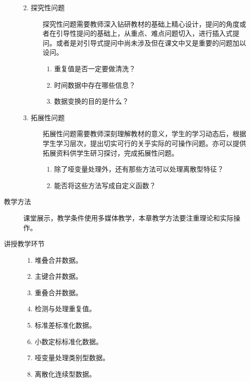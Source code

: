 \documentclass[12pt,a4paper,openany,cap]{ctexbook}
\begin{document}
\begin{description}
\begin{minipage}[t]{0.8\linewidth}
\begin{description}
\item[2. 探究性问题] 
探究性问题需要教师深入钻研教材的基础上精心设计，提问的角度或者在引导性提问的基础上，从重点、难点问题切入，进行插入式提问。或者是对引导式提问中尚未涉及但在课文中又是重要的问题加以设问。
\begin{enumerate}
\item    重复值是否一定要做清洗？
\item\label{item:152}  时间数据中存在哪些信息？
\item\label{item:153}  数据变换的目的是什么？
\end{enumerate}
\item[3. 拓展性问题] 
拓展性问题需要教师深刻理解教材的意义，学生的学习动态后，根据学生学习层次，提出切实可行的关乎实际的可操作问题。亦可以提供拓展资料供学生研习探讨，完成拓展性问题。
\begin{enumerate}
\item  除了哑变量处理外，还有那些方法可以处理离散型特征？
\item\label{item:154}  能否将这些方法写成自定义函数？ 
\end{enumerate}
    \end{description}
  \end{minipage}

\item[教学方法]课堂展示，教学条件使用多媒体教学，本章教学方法要注重理论和实际操作。
\item[讲授教学环节]
  \begin{minipage}[t]{0.8\linewidth}
    \begin{enumerate}
    \item   堆叠合并数据。
\item\label{item:155}  主键合并数据。
\item\label{item:156}  重叠合并数据。
\item\label{item:157}  检测与处理重复值。
\item\label{item:161}  标准差标准化数据。
\item\label{item:162}  小数定标标准化数据。
\item\label{item:163}  哑变量处理类别型数据。
\item\label{item:164}  离散化连续型数据。
    \end{enumerate}
  \end{minipage}


\end{description}
\end{document}
